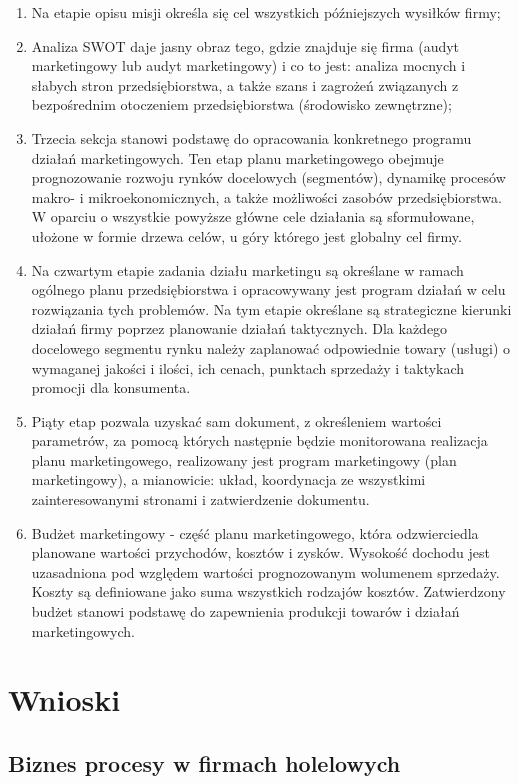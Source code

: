 \documentclass[a4paper, 12pt]{article}
\begin{document}
\begin{enumerate}
	\item Na etapie opisu misji określa się cel wszystkich późniejszych wysiłków firmy;
	\item Analiza SWOT daje jasny obraz tego, gdzie znajduje się firma (audyt marketingowy lub audyt marketingowy) i co to jest: analiza mocnych i słabych stron przedsiębiorstwa, a także szans i zagrożeń związanych z bezpośrednim otoczeniem przedsiębiorstwa (środowisko zewnętrzne);
	\item Trzecia sekcja stanowi podstawę do opracowania konkretnego programu działań marketingowych. Ten etap planu marketingowego obejmuje prognozowanie rozwoju rynków docelowych (segmentów), dynamikę procesów makro- i mikroekonomicznych, a także możliwości zasobów przedsiębiorstwa. W oparciu o wszystkie powyższe główne cele działania są sformułowane, ułożone w formie drzewa celów, u góry którego jest globalny cel firmy.
	\item Na czwartym etapie zadania działu marketingu są określane w ramach ogólnego planu przedsiębiorstwa i opracowywany jest program działań w celu rozwiązania tych problemów. Na tym etapie określane są strategiczne kierunki działań firmy poprzez planowanie działań taktycznych. Dla każdego docelowego segmentu rynku należy zaplanować odpowiednie towary (usługi) o wymaganej jakości i ilości, ich cenach, punktach sprzedaży i taktykach promocji dla konsumenta.
	\item Piąty etap pozwala uzyskać sam dokument, z określeniem wartości parametrów, za pomocą których następnie będzie monitorowana realizacja planu marketingowego, realizowany jest program marketingowy (plan marketingowy), a mianowicie: układ, koordynacja ze wszystkimi zainteresowanymi stronami i zatwierdzenie dokumentu.
	\item Budżet marketingowy - część planu marketingowego, która odzwierciedla planowane wartości przychodów, kosztów i zysków. Wysokość dochodu jest uzasadniona pod względem wartości prognozowanym wolumenem sprzedaży. Koszty są definiowane jako suma wszystkich rodzajów kosztów. Zatwierdzony budżet stanowi podstawę do zapewnienia produkcji towarów i działań marketingowych.
\end{enumerate}
\section{Wnioski} 

\subsection{Biznes procesy w firmach holelowych}
\end{document}
